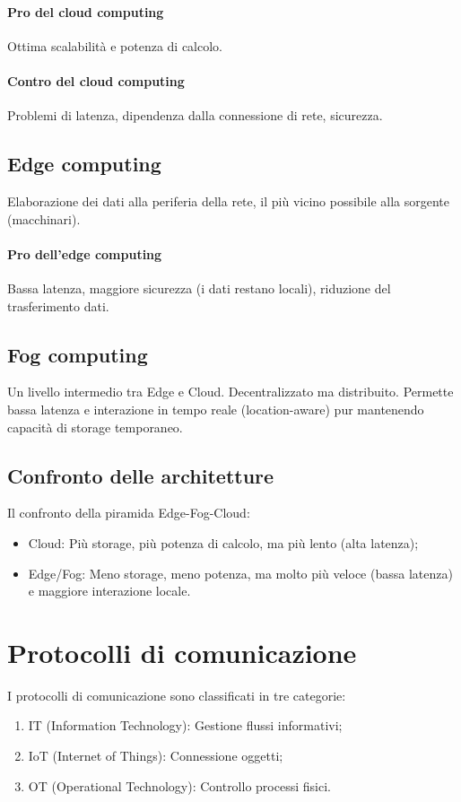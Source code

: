 \paragraph{Pro del cloud computing} Ottima scalabilità e potenza di calcolo.
%
\paragraph{Contro del cloud computing} Problemi di latenza, dipendenza dalla connessione di rete, sicurezza.

%
\subsection{Edge computing}
Elaborazione dei dati alla periferia della rete, il più vicino possibile alla sorgente (macchinari).
%
\paragraph{Pro dell'edge computing} Bassa latenza, maggiore sicurezza (i dati restano locali), riduzione del trasferimento dati.

%
\subsection{Fog computing}
Un livello intermedio tra Edge e Cloud. Decentralizzato ma distribuito.
Permette bassa latenza e interazione in tempo reale (location-aware) pur mantenendo capacità di storage temporaneo.

\subsection{Confronto delle architetture}
Il confronto della piramida Edge-Fog-Cloud:
\begin{itemize}
    \item Cloud: Più storage, più potenza di calcolo, ma più lento (alta latenza);
    \item Edge/Fog: Meno storage, meno potenza, ma molto più veloce (bassa latenza) e maggiore interazione locale.
\end{itemize}

%
\section{Protocolli di comunicazione}
I protocolli di comunicazione sono classificati in tre categorie:
\begin{enumerate}
    \item IT (Information Technology): Gestione flussi informativi;
    \item IoT (Internet of Things): Connessione oggetti;
    \item OT (Operational Technology): Controllo processi fisici.
\end{enumerate}

